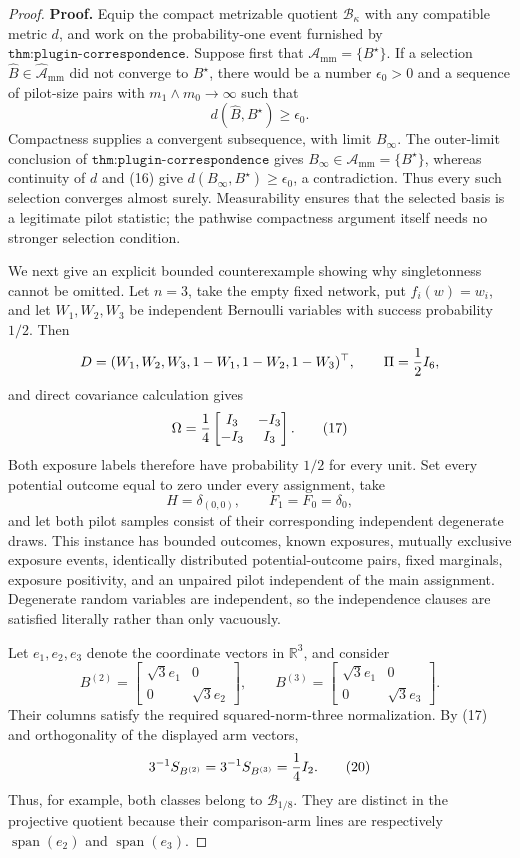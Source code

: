 \documentclass{article}
\begin{document}
\begin{proof}
\textbf{Proof.}
Equip the compact metrizable quotient \(\mathcal B_\kappa\) with any compatible metric \(d\), and work on the probability-one event furnished by \(\texttt{thm:plugin-correspondence}\).  Suppose first that \(\mathcal A_{\mathrm{mm}}=\{B^\star\}\).  If a selection \(\widehat B\in\widehat{\mathcal A}_{\mathrm{mm}}\) did not converge to \(B^\star\), there would be a number \(\epsilon_0>0\) and a sequence of pilot-size pairs with \(m_1\wedge m_0\to\infty\) such that
\[
d(\widehat B,B^\star)\ge\epsilon_0.
\tag{16}
\]
Compactness supplies a convergent subsequence, with limit \(B_\infty\).  The outer-limit conclusion of \(\texttt{thm:plugin-correspondence}\) gives \(B_\infty\in\mathcal A_{\mathrm{mm}}=\{B^\star\}\), whereas continuity of \(d\) and (16) give \(d(B_\infty,B^\star)\ge\epsilon_0\), a contradiction.  Thus every such selection converges almost surely.  Measurability ensures that the selected basis is a legitimate pilot statistic; the pathwise compactness argument itself needs no stronger selection condition.

We next give an explicit bounded counterexample showing why singletonness cannot be omitted.  Let \(n=3\), take the empty fixed network, put \(f_i(w)=w_i\), and let \(W_1,W_2,W_3\) be independent Bernoulli variables with success probability \(1/2\).  Then
\[
D=(W_1,W_2,W_3,1-W_1,1-W_2,1-W_3)^{\top},
\qquad
\Pi={1\over2}I_6,
\]
and direct covariance calculation gives
\[
\Omega={1\over4}
\begin{bmatrix}
I_3&-I_3\\
-I_3&I_3
\end{bmatrix}.
\tag{17}
\]
Both exposure labels therefore have probability \(1/2\) for every unit.  Set every potential outcome equal to zero under every assignment, take
\[
H=\delta_{(0,0)},
\qquad
F_1=F_0=\delta_0,
\tag{18}
\]
and let both pilot samples consist of their corresponding independent degenerate draws.  This instance has bounded outcomes, known exposures, mutually exclusive exposure events, identically distributed potential-outcome pairs, fixed marginals, exposure positivity, and an unpaired pilot independent of the main assignment.  Degenerate random variables are independent, so the independence clauses are satisfied literally rather than only vacuously.

Let \(e_1,e_2,e_3\) denote the coordinate vectors in \(\mathbb R^3\), and consider
\[
B^{(2)}=
\begin{bmatrix}\sqrt3e_1&0\\0&\sqrt3e_2\end{bmatrix},
\qquad
B^{(3)}=
\begin{bmatrix}\sqrt3e_1&0\\0&\sqrt3e_3\end{bmatrix}.
\tag{19}
\]
Their columns satisfy the required squared-norm-three normalization.  By (17) and orthogonality of the displayed arm vectors,
\[
3^{-1}S_{B^{(2)}}=3^{-1}S_{B^{(3)}}={1\over4}I_2.
\tag{20}
\]
Thus, for example, both classes belong to \(\mathcal B_{1/8}\).  They are distinct in the projective quotient because their comparison-arm lines are respectively \(\operatorname{span}(e_2)\) and \(\operatorname{span}(e_3)\).


\end{proof}
\end{document}
